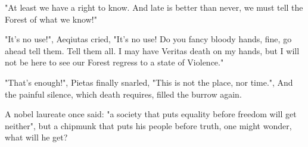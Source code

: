 
"At least we have a right to know. And late is better than never, we must tell the Forest of what we know!"

"It's no use!", Aeqiutas cried, "It's no use! Do you fancy bloody hands, fine, go ahead tell them. Tell them all. I may have Veritas death on my hands, but I will not be here to see our Forest regress to a state of Violence."


"That's enough!", Pietas finally snarled, "This is not the place, nor time.", And the painful silence, which death requires, filled the burrow again.




A nobel laureate once said: "a society that puts equality before freedom will get neither", but a chipmunk that puts his people before truth, one might wonder, what will he get?






